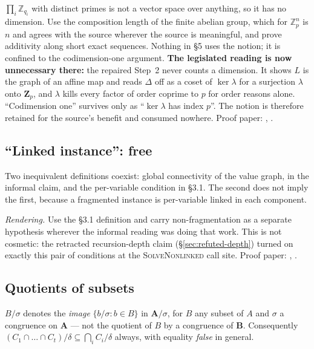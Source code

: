 $\prod_{i}\mathbb Z_{q_{i}}$ with distinct primes is not a vector space over
anything, so it has no dimension. Use the composition length of the finite
abelian group, which for $\mathbb Z_{p}^{n}$ is $n$ and agrees with the source
wherever the source is meaningful, and prove additivity along short exact
sequences. Nothing in \S5 uses the notion; it is confined to the codimension-one
argument. \textbf{The legislated reading is now unnecessary there:} the repaired
Step~2 never counts a dimension. It shows $L$ is the graph of an affine map and
reads $\Delta$ off as a coset of $\ker\lambda$ for a surjection $\lambda$ onto
$\mathbf Z_{p}$, and $\lambda$ kills every factor of order coprime to $p$ for
order reasons alone. ``Codimension one'' survives only as ``$\ker\lambda$ has
index $p$''. The notion is therefore retained for the source's benefit and
consumed nowhere. Proof paper: ,
.

\subsection{``Linked instance'': free}\label{sec:leg-linked}

Two inequivalent definitions coexist: global connectivity of the value graph,
in the informal claim, and the per-variable condition in \S3.1. The second does
not imply the first, because a fragmented instance is per-variable linked in
each component.

\emph{Rendering.} Use the \S3.1 definition and carry non-fragmentation as a
separate hypothesis wherever the informal reading was doing that work. This is
not cosmetic: the retracted recursion-depth claim (\S\ref{sec:refuted-depth})
turned on exactly this pair of conditions at the \textsc{SolveNonlinked} call
site. Proof paper: , .

\subsection{Quotients of subsets}\label{sec:leg-quotient}

$B/\sigma$ denotes the \emph{image} $\{b/\sigma:b\in B\}$ in $\mathbf A/\sigma$,
for $B$ any subset of $A$ and $\sigma$ a congruence on $\mathbf A$ --- not the
quotient of $B$ by a congruence of $\mathbf B$. Consequently
$(C_{1}\cap\dots\cap C_{t})/\delta\subseteq\bigcap_{i}C_{i}/\delta$ always,
with equality \emph{false} in general.

